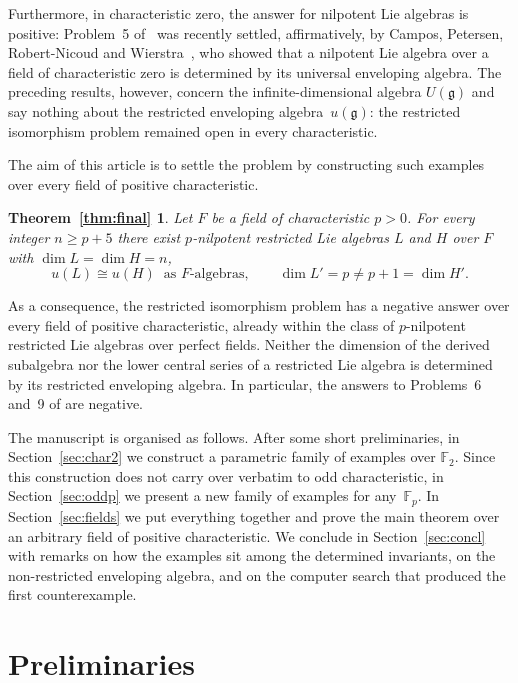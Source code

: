 \documentclass[11pt,reqno]{amsart}
\theoremstyle{plain}
\newtheorem*{thmA}{Theorem~\ref{thm:final}}
\theoremstyle{remark}
\newcommand{\Ft}{\mathbb{F}_2}
\newcommand{\Fp}{\mathbb{F}_p}
\begin{document}
Furthermore, in characteristic zero, the answer for
nilpotent Lie algebras is positive: Problem~5 of~\cite{UsefiSurvey} was
recently settled, affirmatively, by Campos, Petersen, Robert-Nicoud and
Wierstra~\cite{CPRW}, who showed that a nilpotent Lie algebra over a field of
characteristic zero is determined by its universal enveloping algebra. The preceding results, 
however, concern the infinite-dimensional algebra $U(\mathfrak{g})$ and
say nothing about the restricted enveloping algebra~$u(\mathfrak{g})$: the
restricted isomorphism problem remained open in every characteristic.


The aim of this article is to settle the problem by constructing such
examples over every field of positive characteristic.


\begin{thmA}\label{thm:A}
Let $F$ be a field of characteristic $p>0$. For every integer $n\ge p+5$
there exist $p$-nilpotent restricted Lie algebras $L$ and $H$ over $F$ with
$\dim L=\dim H=n$,
\[
u(L)\cong u(H)\ \text{ as $F$-algebras},\qquad
\dim L'=p\neq p+1=\dim H' .
\]
\end{thmA}

As a consequence, the restricted isomorphism problem has a negative
answer over every field of positive characteristic, already within the class
of $p$-nilpotent restricted Lie algebras over perfect fields.
Neither the dimension of the derived subalgebra nor the lower central series
of a restricted Lie algebra is determined by its restricted enveloping
algebra. In particular, the answers to Problems~6 and~9 of
\cite{UsefiSurvey} are negative.

The manuscript is organised as follows. After some short preliminaries, in Section~\ref{sec:char2} we construct a parametric family of examples
over $\Ft$. Since this construction does not carry over verbatim to odd characteristic, in Section~\ref{sec:oddp} we present a new family of examples for any~$\Fp$. 
In Section~\ref{sec:fields} we put everything together and prove the main
theorem over an arbitrary field of positive characteristic.
We conclude in Section~\ref{sec:concl} with remarks on how the examples sit
among the determined invariants, on the non-restricted enveloping algebra, and on the computer search that produced the first
counterexample.


\section{Preliminaries}\label{sec:prelim}
\end{document}

